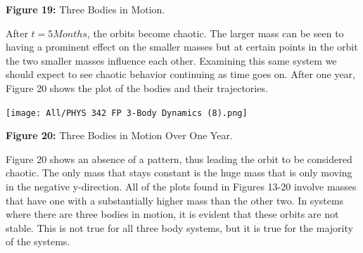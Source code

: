 \documentclass[]{article}
\begin{document}
\begin{multicols}{2}
\begin{center}
\caption{\small{\textbf{Figure 19:}} \tiny{Three Bodies in Motion.}}
\end{center}
After $t=5 Months$, the orbits become chaotic. The larger mass can be seen to having a prominent effect on the smaller masses but at certain points in the orbit the two smaller masses influence each other. Examining this same system we should expect to see chaotic behavior continuing as time goes on. After one year, Figure 20 shows the plot of the bodies and their trajectories.
\begin{center}
\texttt{[image: All/PHYS 342 FP 3-Body Dynamics (8).png]}
\caption{\small{\textbf{Figure 20:}} \tiny{Three Bodies in Motion Over One Year.}}
\end{center}
Figure 20 shows an absence of a pattern, thus leading the orbit to be considered chaotic. The only mass that stays constant is the huge mass that is only moving in the negative y-direction. All of the plots found in Figures 13-20 involve masses that have one with a substantially higher mass than the other two. In systems where there are three bodies in motion, it is evident that these orbits are not stable. This is not true for all three body systems, but it is true for the majority of the systems. 
\par

\end{multicols}
\end{document}
